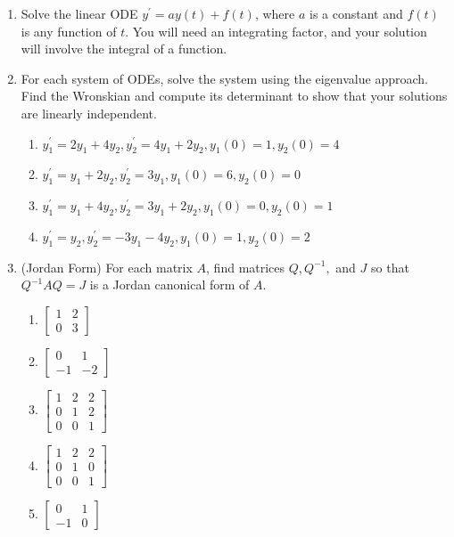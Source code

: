 \begin{multicols}{2}

\begin{enumerate}

\item Solve the linear ODE $y^\prime = ay(t)+f(t)$, where $a$ is a constant and $f(t)$ is any function of $t$. You will need an integrating factor, and your solution will involve the integral of a function.

\item For each system of ODEs, solve the system using the eigenvalue approach.  Find the Wronskian and compute its determinant to show that your solutions are linearly independent.
\begin{enumerate}
\item $y_1^\prime = 2y_1+4y_2, y_2^\prime = 4y_1+2y_2 , y_1(0)=1, y_2(0) = 4$
\item $y_1^\prime = y_1+2y_2, y_2^\prime = 3y_1 , y_1(0)=6, y_2(0) = 0$
\item $y_1^\prime = y_1+4y_2, y_2^\prime = 3y_1+2y_2 , y_1(0)=0, y_2(0) = 1$
\item $y_1^\prime = y_2, y_2^\prime = -3y_1-4y_2 , y_1(0)=1, y_2(0) = 2$
\end{enumerate}

\item (Jordan Form) For each matrix $A$, find matrices $Q,Q^{-1},$ and $J$ so that $Q^{-1}AQ=J$ is a Jordan canonical form of $A$.
\begin{multicols}{2}
\begin{enumerate}
	\item $\begin{bmatrix}1&2\\0&3\end{bmatrix}$
	\item $\begin{bmatrix}0&1\\-1&-2\end{bmatrix}$
	\item $\begin{bmatrix}1&2&2\\0&1&2\\0&0&1 \end{bmatrix}$
	\item $\begin{bmatrix}1&2&2\\0&1&0\\0&0&1 \end{bmatrix}$
	\item $\begin{bmatrix}0&1\\-1&0\end{bmatrix}$
\end{enumerate}
\end{multicols}


\end{enumerate}
\end{multicols}
